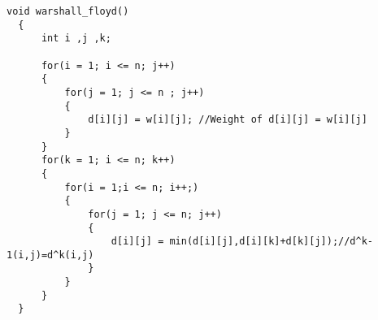 \documentclass[a4paper,titlepage,11pt]{ltjsarticle}
\begin{document}
\begin{lstlisting}[caption=enshukadai9]
  void warshall_floyd()
  {
      int i ,j ,k;
  
      for(i = 1; i <= n; j++)
      {
          for(j = 1; j <= n ; j++)
          {
              d[i][j] = w[i][j]; //Weight of d[i][j] = w[i][j]
          }
      }
      for(k = 1; i <= n; k++)
      {
          for(i = 1;i <= n; i++;)
          {
              for(j = 1; j <= n; j++)
              {
                  d[i][j] = min(d[i][j],d[i][k]+d[k][j]);//d^k-1(i,j)=d^k(i,j)
              }
          }
      }
  }
\end{lstlisting}
\end{document}
